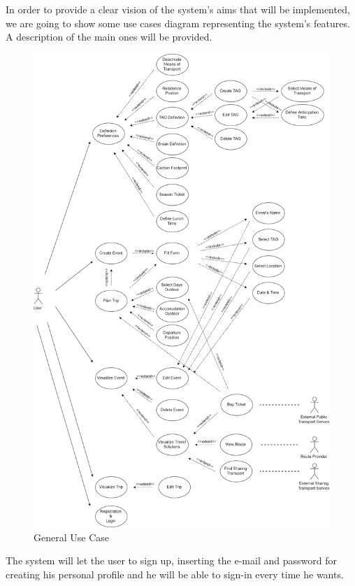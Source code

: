 In order to provide a clear vision of the system’s aims that will be implemented, we are going to show some use cases diagram representing the system’s features. A description of the main ones will be provided.
\begin{figure}[H]
	\centering
	\includegraphics[scale=0.25]{Images/Use_Case/General_Use_Case}
	\caption{General Use Case}
\end{figure}

The system will let the user to sign up, inserting the e-mail and password for creating his personal profile and he will be able to sign-in every time he wants.

